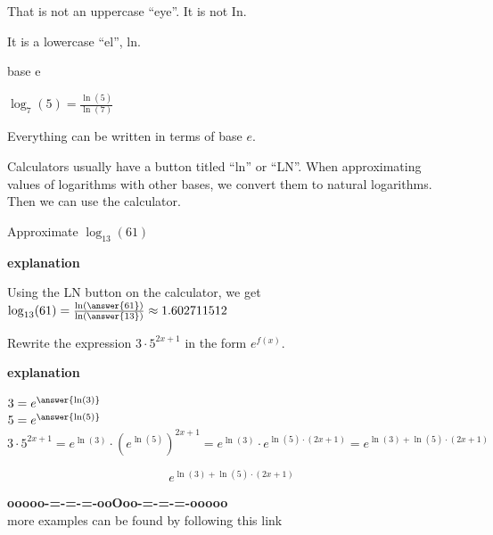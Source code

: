\documentclass{ximera}
\begin{document}
\begin{warning}
That is not an uppercase ``eye''.  It is not In.  

It is a lowercase ``el'', ln.
\end{warning}




\begin{example}  base e


$\log_7(5) = \frac{\ln(5)}{\ln(7)}$


\end{example}
Everything can be written in terms of base $e$. 


Calculators usually have a button titled ``ln'' or ``LN''.  When approximating values of logarithms with other bases, we convert them to natural logarithms.  Then we can use the calculator.









\begin{example}  


Approximate $\log_{13}(61)$


\textbf{\textcolor{red!75!green}{explanation}} 


Using the LN button on the calculator, we get $\log_{13}(61) = \frac{\ln\left(\answer{61}\right)}{\ln\left(\answer{13}\right)} \approx 1.602711512$


\end{example}








\begin{example}  


Rewrite the expression $3 \cdot 5^{2x + 1}$ in the form $e^{f(x)}$.


\textbf{\textcolor{red!75!green}{explanation}} 


$3 = e^{\answer{\ln(3)}}$ \\


$5 = e^{\answer{\ln(5)}}$ \\


\[   3 \cdot 5^{2x + 1} = e^{\ln(3)} \cdot (e^{\ln(5)})^{2x + 1}  =  e^{\ln(3)} \cdot e^{\ln(5) \cdot (2x + 1)}  = e^{\ln(3) + \ln(5) \cdot (2x + 1)} \]


\[  e^{\ln(3) + \ln(5) \cdot (2x + 1)} \] 


\end{example}














\begin{center}
\textbf{\textcolor{green!50!black}{ooooo-=-=-=-ooOoo-=-=-=-ooooo}} \\

more examples can be found by following this link\\ 

\end{center}
\end{document}
